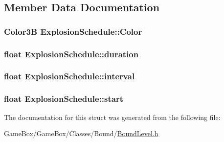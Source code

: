 \subsection{\-Member \-Data \-Documentation}
\hypertarget{struct_explosion_schedule_ab3b56c84ed3937a294738e7c4b97b1da}{
\subsubsection[{\-Color}]{\setlength{\rightskip}{0pt plus 5cm}\-Color3\-B {\bf \-Explosion\-Schedule\-::\-Color}}}\label{struct_explosion_schedule_ab3b56c84ed3937a294738e7c4b97b1da}
\hypertarget{struct_explosion_schedule_a53661dc35b3c59c679ebe5ef1cebc29d}{
\subsubsection[{duration}]{\setlength{\rightskip}{0pt plus 5cm}float {\bf \-Explosion\-Schedule\-::duration}}}\label{struct_explosion_schedule_a53661dc35b3c59c679ebe5ef1cebc29d}
\hypertarget{struct_explosion_schedule_a522eba73a372d30f86e5dfa608329ed6}{
\subsubsection[{interval}]{\setlength{\rightskip}{0pt plus 5cm}float {\bf \-Explosion\-Schedule\-::interval}}}\label{struct_explosion_schedule_a522eba73a372d30f86e5dfa608329ed6}
\hypertarget{struct_explosion_schedule_a40229a03d0070fa6d8028cac8b7490e0}{
\subsubsection[{start}]{\setlength{\rightskip}{0pt plus 5cm}float {\bf \-Explosion\-Schedule\-::start}}}\label{struct_explosion_schedule_a40229a03d0070fa6d8028cac8b7490e0}


\-The documentation for this struct was generated from the following file\-:\begin{DoxyCompactItemize}
\item 
\-Game\-Box/\-Game\-Box/\-Classes/\-Bound/\hyperlink{_bound_level_8h}{\-Bound\-Level.\-h}\end{DoxyCompactItemize}
